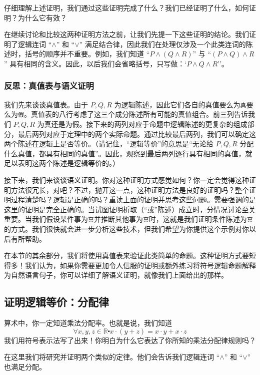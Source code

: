仔细理解上述证明，我们通过这些证明完成了什么？我们已经证明了什么，如何证明？为什么它有效？

在继续讨论和比较这两种证明方法之前，让我们先提一下这些证明的结论。我们证明了逻辑连词 ``$\land$'' 和 ``$\lor$'' 满足结合律，因此我们在处理仅涉及一个此类连词的陈述时，括号的顺序并不重要。例如，我们知道 ``$P \land (Q \land R)$'' 与 ``$(P \land Q) \land R$'' 具有相同的含义。因此，以后我们会省略括号，只写做：`$P \land Q \land R$''。

\subsubsection*{反思：真值表与语义证明}

我们先来谈谈真值表。由于 $P,Q,R$ 为逻辑陈述，因此它们各自的真值要么为\verb|真|要么为\verb|假|。真值表的八行考虑了这三个成分陈述所有可能的真值组合。前三列告诉我们 $P,Q,R$ 为真还是为假。接下来的两列对应于命题中逻辑陈述的更复杂的组成部分，最后两列对应于定理中的两个实际命题。通过比较最后两列，我们可以确定这两个陈述在逻辑上是否等价。（请记住，``逻辑等价''的意思是``无论给 $P, Q, R$ 分配什么真值，都具有相同的真值''。因此，观察到最后两列逐行具有相同的真值，就足以表明这两个陈述是逻辑等价的。）

接下来，我们来谈谈语义证明。你对这种证明方式感觉如何？你一定会觉得这种证明方法很冗长，对吧？不过，抛开这一点，这种证明方法是良好的证明吗？整个证明过程清楚吗？逻辑是正确的吗？重读上面的证明并思考这些问题。需要强调的是这里的证明是完全正确的。当试图证明析取（``或''陈述）成立时，分情况讨论至关重要。当我们假设某件事为\verb|真|并推断其他事为\verb|真|时，这就是我们证明条件陈述为\verb|真|的方式。我们很快就会进一步分析这些技术，但我们希望为你提供这个示例对你以后有所帮助。

在本节的其余部分，我们将使用真值表来验证此类简单的命题。这种证明方式要短得多！我们认为，如果你需要更加令人信服的证明或额外练习将符号逻辑命题解释为自然语言句子，你可以详细了解语义证明，就像我们上面给出的那样。

\subsection{证明逻辑等价：分配律}

算术中，你一定知道乘法分配率。也就是说，我们知道
\[\forall x, y, z \in \mathbb{R} \centerdot x \cdot (y + z) = x \cdot y + x \cdot z\]
我们用符号表示法写了出来！你明白为什么它表达了你所知的乘法分配律规则吗？

在这里我们将研究并证明两个类似的定律。他们会告诉我们逻辑连词 ``$\land$'' 和 ``$\lor$'' 也满足分配。


